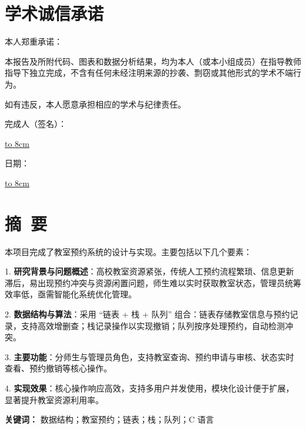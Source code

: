 \documentclass[a4paper,12pt,twoside]{ctexrep}
\newcommand{\evenblank}{%
  \clearpage
  \checkoddpage
  \ifoddpage
    \thispagestyle{empty}\null\newpage
  \fi
}
\newcommand*{\kai}{\CJKfamily{zhkai}}
\newcommand{\CenteredField}[2][8cm]{%
  \begin{minipage}[t]{#1}
    \setlength{\parindent}{0pt}
    \centering
    \underline{\hbox to #1{\hfil#2\hfil}}
  \end{minipage}%
}
\begin{document}

\clearpage
{}

\evenblank
\chapter*{学术诚信承诺}
\thispagestyle{empty}

{\kai \Large 本人郑重承诺：

本报告及所附代码、图表和数据分析结果，均为本人（或本小组成员）在指导教师指导下独立完成，不含有任何未经注明来源的抄袭、剽窃或其他形式的学术不端行为。

如有违反，本人愿意承担相应的学术与纪律责任。

\vspace{2cm}

\hfill \noindent 完成人（签名）：
\CenteredField[8cm]{}

\vspace{1cm}

\hfill \noindent 日期：
\CenteredField[8cm]{}}

\newpage

\chapter*{摘\ 要}
\thispagestyle{empty}

本项目完成了教室预约系统的设计与实现。主要包括以下几个要素：

1. \textbf{研究背景与问题概述}：高校教室资源紧张，传统人工预约流程繁琐、信息更新滞后，易出现预约冲突与资源闲置问题，师生难以实时获取教室状态，管理员统筹效率低，亟需智能化系统优化管理。

2. \textbf{数据结构与算法}：采用 “链表 + 栈 + 队列” 组合：链表存储教室信息与预约记录，支持高效增删查；栈记录操作以实现撤销；队列按序处理预约，自动检测冲突。

3. \textbf{主要功能}：分师生与管理员角色，支持教室查询、预约申请与审核、状态实时查看、预约撤销等核心操作。

4. \textbf{实现效果}：核心操作响应高效，支持多用户并发使用，模块化设计便于扩展，显著提升教室资源利用率。

\vspace{1cm}

\noindent\textbf{关键词：} 数据结构；教室预约；链表；栈；队列；C 语言

\newpage
\end{document}
